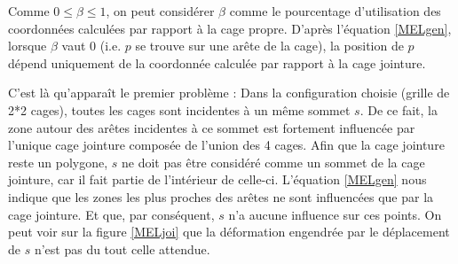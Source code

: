 Comme $0 \leq \beta \leq 1$, on peut considérer $\beta$ comme le
pourcentage d'utilisation des coordonnées calculées par rapport à la
cage propre. D'après l'équation \ref{MELgen}, lorsque $\beta$ vaut 0
(i.e. $p$ se trouve sur une arête de la cage), la position de $p$
dépend uniquement de la coordonnée calculée par rapport à la cage
jointure.

C'est là qu'apparaît le premier problème : Dans la configuration
choisie (grille de 2*2 cages), toutes les cages sont incidentes à un
même sommet $s$. De ce fait, la zone autour des arêtes incidentes à ce
sommet est fortement influencée par l'unique cage jointure composée de
l'union des 4 cages. Afin que la cage jointure reste un polygone, $s$
ne doit pas être considéré comme un sommet de la cage jointure, car il
fait partie de l'intérieur de celle-ci. L'équation \ref{MELgen} nous
indique que les zones les plus proches des arêtes ne sont influencées
que par la cage jointure. Et que, par conséquent, $s$ n'a aucune
influence sur ces points. On peut voir sur la figure \ref{MELjoi} que
la déformation engendrée par le déplacement de $s$ n'est pas du tout
celle attendue.

